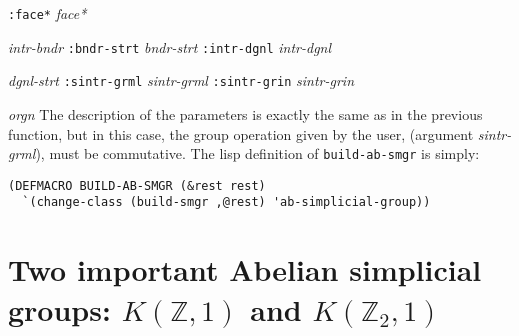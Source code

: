              {\tt :face*} {\em face*}  \par
\hspace {0.60cm}{\tt :intr-bndr} {\em intr-bndr} {\tt :bndr-strt} {\em bndr-strt} {\tt :intr-dgnl} {\em intr-dgnl} \par
\hspace {0.60cm}{\tt :dgnl-strt} {\em dgnl-strt} {\tt :sintr-grml} {\em sintr-grml} {\tt :sintr-grin} {\em sintr-grin} \par
\hspace {0.60cm}{\tt :orgn} {\em orgn}
\vskip 0.35cm
The description of the parameters is exactly the same as in the previous function, but in this case,
the group operation given by the user, (argument {\em sintr-grml}), must be commutative.
The lisp definition of {\tt build-ab-smgr} is simply:
{\footnotesize\begin{verbatim}
(DEFMACRO BUILD-AB-SMGR (&rest rest)
  `(change-class (build-smgr ,@rest) 'ab-simplicial-group))
\end{verbatim}}

\section {Two important Abelian simplicial groups: $K(\mathbb{Z}, 1)$ and $K(\mathbb{Z}_2, 1)$}


